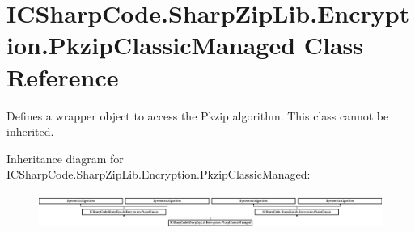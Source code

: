 \hypertarget{class_i_c_sharp_code_1_1_sharp_zip_lib_1_1_encryption_1_1_pkzip_classic_managed}{}\section{I\+C\+Sharp\+Code.\+Sharp\+Zip\+Lib.\+Encryption.\+Pkzip\+Classic\+Managed Class Reference}
\label{class_i_c_sharp_code_1_1_sharp_zip_lib_1_1_encryption_1_1_pkzip_classic_managed}


Defines a wrapper object to access the Pkzip algorithm. This class cannot be inherited.  


Inheritance diagram for I\+C\+Sharp\+Code.\+Sharp\+Zip\+Lib.\+Encryption.\+Pkzip\+Classic\+Managed\+:\begin{figure}[H]
\begin{center}
\leavevmode
\includegraphics[height=1.157025cm]{class_i_c_sharp_code_1_1_sharp_zip_lib_1_1_encryption_1_1_pkzip_classic_managed}
\end{center}
\end{figure}
